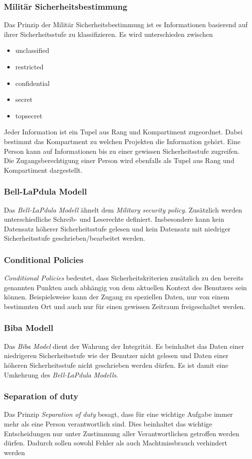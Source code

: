 \subsubsection{Militär Sicherheitsbestimmung}
Das Prinzip der Militär Sicherheitsbestimmung ist es Informationen basierend auf ihrer Sicherheitsstufe zu klassifizieren. Es wird unterschieden zwischen
\begin{itemize}
\item unclassified
\item restricted
\item confidential
\item secret 
\item topsecret
\end{itemize} 
Jeder Information ist ein Tupel aus Rang und Kompartiment zugeordnet. Dabei bestimmt das Kompartment zu welchen Projekten die Information gehört. 
Eine Person kann auf Informationen bis zu einer gewissen Sicherheitsstufe zugreifen. Die Zugangsberechtigung einer Person wird ebenfalls als Tupel aus Rang und Kompartiment dargestellt.   
\subsubsection{Bell-LaPdula Modell}
Das \textit{Bell-LaPdula Modell} ähnelt dem \textit{Military security policy}. Zusätzlich werden unterschiedliche Schreib- und Leserechte definiert. Insbesondere kann kein Datensatz höherer Sicherheitsstufe gelesen und kein Datensatz mit niedriger Sicherheitsstufe geschrieben/bearbeitet werden.
\subsubsection{Conditional Policies}
\textit{Conditional Policies} bedeutet, dass Sicherheitskriterien zusätzlich zu den bereits genannten Punkten auch abhängig von dem aktuellen Kontext des Benutzers sein können. Beispielsweise kann der Zugang zu speziellen Daten, nur von einem bestimmten Ort und auch nur für einen gewissen Zeitraum freigeschaltet werden.
\subsubsection{Biba Modell}
Das \textit{Biba Model} dient der Wahrung der Integrität. Es beinhaltet das Daten einer niedrigeren Sicherheitsstufe wie der Benutzer nicht gelesen und Daten einer höheren Sicherheitsstufe nicht geschrieben werden dürfen. Es ist damit eine Umkehrung des \textit{Bell-LaPdula Modells}.
\subsubsection{Separation of duty}
Das Prinzip \textit{Separation of duty} besagt, dass für eine wichtige Aufgabe immer mehr als eine Person verantwortlich sind. Dies beinhaltet das wichtige Entscheidungen nur unter Zustimmung aller Verantwortlichen getroffen werden dürfen. Dadurch sollen sowohl Fehler als auch Machtmissbrauch verhindert werden
